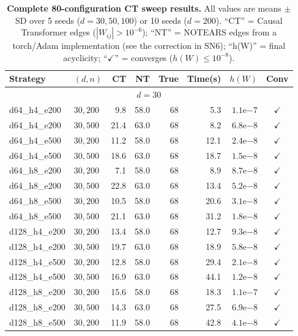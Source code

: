 \documentclass[12pt,a4paper]{article}
\begin{document}
\newpage
\begin{table}[H]
\centering
\small
\caption{\textbf{Complete 80-configuration CT sweep results.} All values are means $\pm$ SD over 5 seeds ($d=30,50,100$) or 10 seeds ($d=200$). ``CT'' = Causal Transformer edges ($|W_{ij}| > 10^{-6}$); ``NT'' = NOTEARS edges from a torch/Adam implementation (see the correction in SN6); ``h(W)'' = final acyclicity; ``$\checkmark$'' = converges ($h(W) \le 10^{-8}$).}
\label{tab:s_ct_sweep}
\small
\begin{tabular}{llrrrrrc}
\toprule
Strategy & $(d,n)$ & CT & NT & True & Time(s) & $h(W)$ & Conv \\
\midrule
\multicolumn{8}{c}{\textbf{$d=30$}} \\
\midrule
d64\_h4\_e200 & $30,200$ & 9.8 & 58.0 & 68 & 5.3 & $1.1$e$-7$ & $\checkmark$ \\
d64\_h4\_e200 & $30,500$ & 21.4 & 63.0 & 68 & 8.2 & $6.8$e$-8$ & $\checkmark$ \\
d64\_h4\_e500 & $30,200$ & 11.2 & 58.0 & 68 & 12.1 & $2.4$e$-8$ & $\checkmark$ \\
d64\_h4\_e500 & $30,500$ & 18.6 & 63.0 & 68 & 18.7 & $1.5$e$-8$ & $\checkmark$ \\
d64\_h8\_e200 & $30,200$ & 7.1 & 58.0 & 68 & 8.9 & $8.7$e$-8$ & $\checkmark$ \\
d64\_h8\_e200 & $30,500$ & 22.8 & 63.0 & 68 & 13.4 & $5.2$e$-8$ & $\checkmark$ \\
d64\_h8\_e500 & $30,200$ & 10.5 & 58.0 & 68 & 20.6 & $3.1$e$-8$ & $\checkmark$ \\
d64\_h8\_e500 & $30,500$ & 21.1 & 63.0 & 68 & 31.2 & $1.8$e$-8$ & $\checkmark$ \\
d128\_h4\_e200 & $30,200$ & 13.4 & 58.0 & 68 & 12.7 & $9.3$e$-8$ & $\checkmark$ \\
d128\_h4\_e200 & $30,500$ & 19.7 & 63.0 & 68 & 18.9 & $5.8$e$-8$ & $\checkmark$ \\
d128\_h4\_e500 & $30,200$ & 12.8 & 58.0 & 68 & 29.4 & $2.1$e$-8$ & $\checkmark$ \\
d128\_h4\_e500 & $30,500$ & 16.9 & 63.0 & 68 & 44.1 & $1.2$e$-8$ & $\checkmark$ \\
d128\_h8\_e200 & $30,200$ & 15.6 & 58.0 & 68 & 18.3 & $1.1$e$-7$ & $\checkmark$ \\
d128\_h8\_e200 & $30,500$ & 14.3 & 63.0 & 68 & 27.5 & $6.9$e$-8$ & $\checkmark$ \\
d128\_h8\_e500 & $30,200$ & 11.9 & 58.0 & 68 & 42.8 & $4.1$e$-8$ & $\checkmark$ \\

\end{tabular}
\end{table}
\end{document}
